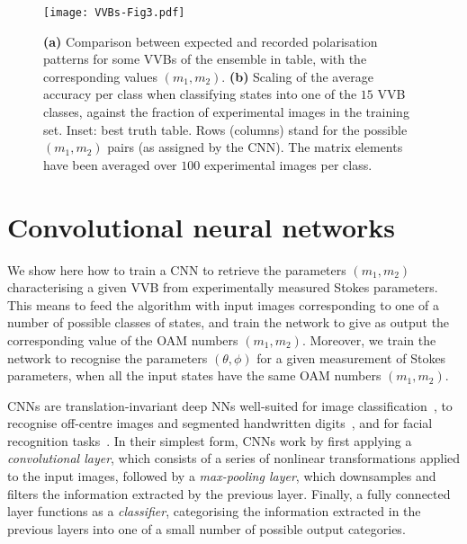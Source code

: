 \begin{figure}[tb]
    \centering
    \texttt{[image: VVBs-Fig3.pdf]}
    \caption{
	    \textbf{(a)} Comparison between expected and recorded polarisation patterns for some \acp{VVB} of the ensemble in table, with the corresponding values $(m_1,m_2)$.
	    \textbf{(b)} Scaling of the average accuracy per class when classifying states into one of the $15$ VVB classes,
	    against the fraction of experimental images in the training set. 
	    Inset: best truth table.
	    Rows (columns) stand for the possible $(m_1,m_2)$ pairs (as assigned by the CNN). The matrix elements have been averaged over $100$ experimental images per class.
    }%
    \label{fig:VVBs:resultsCNN}
\end{figure}



\section{Convolutional neural networks}
\label{sec:VVBs:CNNs}

We show here how to train a \ac{CNN} to retrieve the parameters $(m_1,m_2)$ characterising a given VVB from experimentally measured Stokes parameters.
This means to feed the algorithm with input images corresponding to one of a number of possible classes of states, and train the network to give as output the corresponding value of the OAM numbers $(m_1,m_2)$.
Moreover, we train the network to recognise the parameters $(\theta,\phi)$ for a given measurement of Stokes parameters, when all the input states have the same OAM numbers $(m_1,m_2)$.

\acp{CNN} are translation-invariant deep NNs well-suited for image classification~\cite{lecun2015deep}, to recognise off-centre images and segmented handwritten digits~\cite{simard2003best,ciresan2011flexible},
and for facial recognition tasks~\cite{matsugu2003subject}. 
In their simplest form, \acp{CNN} work by first applying a \emph{convolutional layer}, which consists of a series of nonlinear transformations applied to the input images, followed by a \emph{max-pooling layer}, which downsamples and filters the information extracted by the previous layer. Finally, a fully connected layer functions as a \emph{classifier}, categorising the information extracted in the previous layers into one of a small number of possible output categories.

